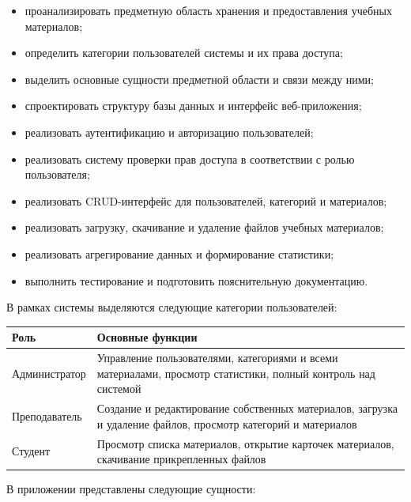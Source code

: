\begin{itemize}[leftmargin=1.25cm]
    \item проанализировать предметную область хранения и предоставления учебных материалов;
    \item определить категории пользователей системы и их права доступа;
    \item выделить основные сущности предметной области и связи между ними;
    \item спроектировать структуру базы данных и интерфейс веб-приложения;
    \item реализовать аутентификацию и авторизацию пользователей;
    \item реализовать систему проверки прав доступа в соответствии с ролью пользователя;
    \item реализовать CRUD-интерфейс для пользователей, категорий и материалов;
    \item реализовать загрузку, скачивание и удаление файлов учебных материалов;
    \item реализовать агрегирование данных и формирование статистики;
    \item выполнить тестирование и подготовить пояснительную документацию.
\end{itemize}

В рамках системы выделяются следующие категории пользователей:

\begin{center}
\small\begin{tabularx}{0.96\textwidth}{>{\raggedright\arraybackslash}p{4.2cm} >{\raggedright\arraybackslash}X}
\toprule
\textbf{Роль} & \textbf{Основные функции} \\
\midrule
Администратор & Управление пользователями, категориями и всеми материалами, просмотр статистики, полный контроль над системой \\
Преподаватель & Создание и редактирование собственных материалов, загрузка и удаление файлов, просмотр категорий и материалов \\
Студент & Просмотр списка материалов, открытие карточек материалов, скачивание прикрепленных файлов \\
\bottomrule
\end{tabularx}
\end{center}

В приложении представлены следующие сущности:

